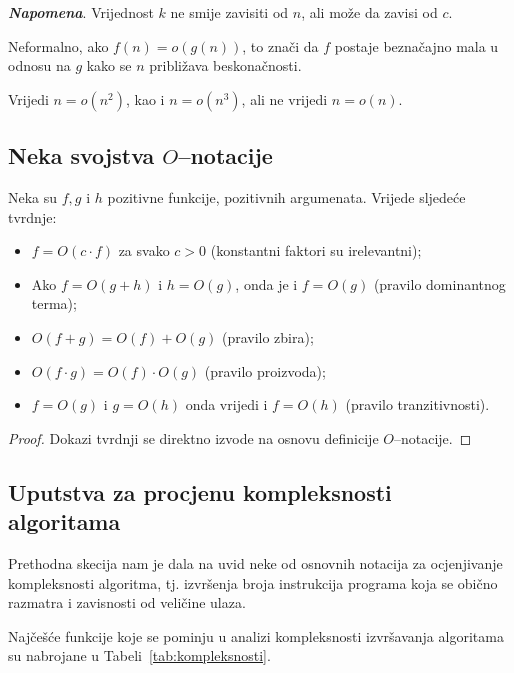\noindent \textbf{\textit{Napomena}}. Vrijednost $k$ ne smije zavisiti od $n$, ali može da zavisi od $c$.

Neformalno, ako $f(n) = o(g(n))$, to znači da  $f$ postaje beznačajno mala u odnosu na $g$ kako se $n$ približava beskonačnosti.

\begin{example}
    Vrijedi $n = o(n^2)$, kao i $n = o(n^3)$, ali ne vrijedi $n = o(n)$. 
\end{example}

\subsection{Neka svojstva $O$--notacije}

\begin{theorem} Neka su $f, g$ i $h$ pozitivne funkcije, pozitivnih argumenata.  Vrijede sljedeće tvrdnje:
	\begin{itemize}
		\item 	  $f = O(c \cdot f)$ za svako $c > 0$ (konstantni faktori su irelevantni);
		\item Ako $f = O(g +  h)$ i $h = O(g)$, onda je i $f = O(g)$  (pravilo dominantnog terma);
		\item $O(f + g) = O(f)  + O(g)$ (pravilo zbira);
		\item $O( f \cdot g) = O(f) \cdot O(g)$ (pravilo proizvoda);
        \item $f = O(g)$ i $g = O(h)$ onda
        vrijedi i $f = O(h)$ (pravilo tranzitivnosti). 
	\end{itemize}
 
\end{theorem}

\begin{proof}
	Dokazi tvrdnji se direktno izvode na osnovu definicije $O$--notacije.
\end{proof}

\subsection{Uputstva za procjenu kompleksnosti algoritama}

Prethodna skecija nam je dala na uvid neke od osnovnih notacija za ocjenjivanje kompleksnosti   algoritma, tj. izvršenja broja instrukcija programa koja se obično razmatra i zavisnosti od veličine ulaza. 

 Najčešće funkcije koje se pominju u analizi kompleksnosti izvršavanja algoritama su nabrojane u Tabeli~\ref{tab:kompleksnosti}. 
 
